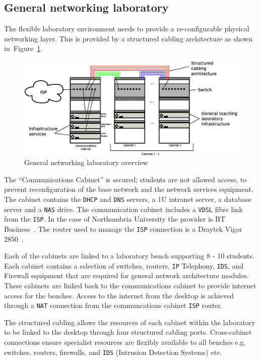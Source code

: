 \subsection{General networking laboratory}
The flexible laboratory environment needs to provide a re-configurable physical networking layer. This is provided by a structured cabling architecture as shown in~Figure~\ref{fig:Overview1}. 

\begin{figure}[h]
\begin{center}
	\includegraphics[scale=0.4]{Images/Infrastructure.eps}
\caption{General networking laboratory overview}
\label{fig:Overview1}
\end{center}
\end{figure}

The ``Communications Cabinet'' is secured; students are not allowed access, to prevent reconfiguration of the base network and the network services equipment. The cabinet contains the \texttt{DHCP} and \texttt{DNS} servers, a 1U intranet server, a database server and a \texttt{NAS} drive. The communication cabinet includes a \texttt{VDSL} fibre link from the \texttt{ISP}. In the case of Northumbria University the provider is BT Business~\cite{BT:17}. The router used to manage the \texttt{ISP} connection is a Draytek Vigor 2850~\cite{DC:17}.

Each of the cabinets are linked to a laboratory bench supporting 8 - 10 students. Each cabinet contains a selection of switches, routers, \texttt{IP} Telephony, \texttt{IDS}, and Firewall equipment that are required for general network architecture modules. These cabinets are linked back to the communications cabinet to provide internet access for the benches. Access to the internet from the desktop is achieved through a \texttt{NAT} connection from the communcations cabinet \texttt{ISP} router. 

The structured cabling allows the resources of each cabinet within the laboratory to be linked to the desktop through four structured cabling ports. Cross-cabinet connections ensure specialist resources are flexibly available to all benches e.g. switches, routers, firewalls, and \texttt{IDS} (Intrusion Detection Systems) etc.

